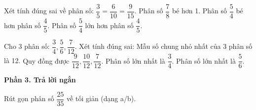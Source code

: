 \begin{ex} %
Xét tính đúng sai về phân số:
\choiceTF
{\True $\dfrac{3}{5} = \dfrac{6}{10} = \dfrac{9}{15}$.}
{\True Phân số $\dfrac{7}{8}$ bé hơn 1.}
{Phân số $\dfrac{5}{4}$ bé hơn phân số $\dfrac{4}{5}$.}
{\True Phân số $\dfrac{5}{4}$ lớn hơn phân số $\dfrac{4}{5}$.}
\end{ex}

\begin{ex} %
Cho 3 phân số: $\dfrac{3}{4}, \dfrac{5}{6}, \dfrac{7}{12}$. Xét tính đúng sai:
\choiceTF
{\True Mẫu số chung nhỏ nhất của 3 phân số là 12.}
{\True Quy đồng được $\dfrac{9}{12}, \dfrac{10}{12}, \dfrac{7}{12}$.}
{Phân số lớn nhất là $\dfrac{3}{4}$.}
{\True Phân số lớn nhất là $\dfrac{5}{6}$.}
\end{ex}

\textbf{Phần 3. Trả lời ngắn}

\begin{ex} %
Rút gọn phân số $\dfrac{25}{35}$ về tối giản (dạng a/b).
\end{ex}

